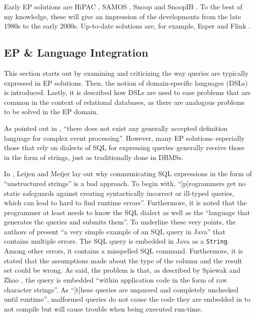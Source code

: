 \documentclass[article, type=bsc, colorback, accentcolor=tud8b, parskip=half, bibliography=totocnumbered]{tudthesis}
\begin{document}
Early EP solutions are HiPAC \cite{Dayal:1988:HPC:44203.44208}, SAMOS \cite{Gatziu:1996:SAO:901611}, Snoop \cite{Chakravarthy:1994:CEA:645920.672994} and SnoopIB \cite{Adaikkalavan:2006:SIE:1176530.1176536}.
To the best of my knowledge, these will give an impression of the developments from the late 1980s to the early 2000s.
Up-to-date solutions are, for example, Esper \cite{esper} and Flink \cite{flink}.

\subsection{EP \& Language Integration}
\label{sec:ep_language_integration}

This section starts out by examining and criticizing the way queries are typically expressed in EP solutions.
Then, the notion of domain-specific languages (DSLs) is introduced.
Lastly, it is described how DSLs are used to ease problems that are common in the context of relational databases, as there are analogous problems to be solved in the EP domain.

As pointed out in \cite{Schilling:2010:DHE:1827418.1827453}, ``there does not exist any generally accepted definition language for complex event processing''.
However, many EP solutions--especially those that rely on dialects of SQL for expressing queries--generally receive those in the form of strings, just as traditionally done in DBMSs.

In \cite{Leijen:1999:DSE:331960.331977}, Leijen and Meijer lay out why communicating SQL expressions in the form of ``unstructured strings'' is a bad approach.
To begin with, ``[p]rogrammers get no static safeguards against creating syntactically incorrect or ill-typed queries, which can lead to hard to find runtime errors''.
Furthermore, it is noted that the programmer at least needs to know the SQL dialect as well as the ``language that generates the queries and submits them''.
To underline these very points, the authors of \cite{Kabanov:2008:ETD:1411732.1411758} present ``a very simple example of an SQL query in Java'' that contains multiple errors.
The SQL query is embedded in Java as a \lstinline{String}.
Among other errors, it contains a misspelled SQL command.
Furthermore, it is stated that the assumptions made about the type of the column and the result set could be wrong.
As said, the problem is that, as described by Spiewak and Zhao \cite{Spiewak:2009:SLD:2127907.2127923}, the query is embedded ``within application code in the form of raw character strings''.
As ``[t]hese queries are unparsed and completely unchecked until runtime'', malformed queries do not cause the code they are embedded in to not compile but will cause trouble when being executed run-time.
\end{document}
